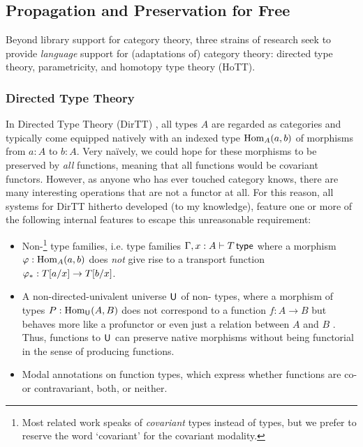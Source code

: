 \documentclass{lmcs} %
\theoremstyle{plain}\newtheorem{satz}[thm]{Satz} %
\theoremstyle{plain}
\theoremstyle{definition}
\begin{document}
\subsection{Propagation and Preservation for Free}
Beyond library support for category theory, three strains of research seek to provide \emph{language} support for (adaptations of) category theory:
directed type theory, parametricity, and homotopy type theory (HoTT).

\subsubsection{Directed Type Theory}
In Directed Type Theory (DirTT) \cite{2dtt,riehl-shulman-dtt,north-dirhott,weaver-licata-dua,dua-simplicial}, all types $A$ are regarded as categories and typically come equipped natively with an indexed type ${\mathrm{Hom}}_A(a, b)$ of morphisms from $a : A$ to $b : A$.
Very na\"ively, we could hope for these morphisms to be preserved by \emph{all} functions, meaning that all functions would be covariant functors.
However, as anyone who has ever touched category knows, there are many interesting operations that are not a functor at all.
For this reason, all systems for DirTT hitherto developed (to my knowledge), feature one or more of the following internal features to escape this unreasonable requirement:
\begin{itemize}
	\item Non-\covarfib{}\footnote{Most related work speaks of \emph{covariant} types instead of \covarfib{} types, but we prefer to reserve the word `covariant' for the covariant modality.} type families, i.e. type families $\Gamma, x : A \vdash T \,\mathsf{type}$ where a morphism $\varphi : {\mathrm{Hom}}_A(a, b)$ does \emph{not} give rise to a transport function $\varphi_* : T[a/x] \to T[b/x]$.
	\item A non-directed-univalent universe $\mathsf{U}_{}$ of non-\covarfib{} types, where a morphism of types $P : {\mathrm{Hom}}_{\mathsf{U}_{}}(A, B)$ does not correspond to a function $f : A \to B$ but behaves more like a profunctor or even just a relation between $A$ and $B$ \cite{riehl-shulman-dtt,weaver-licata-dua,dua-simplicial}.
	Thus, functions to $\mathsf{U}_{}$ can preserve native morphisms without being functorial in the sense of producing functions.
	\item Modal annotations on function types, which express whether functions are co- or contravariant, both, or neither. \cite{abel-polarized,2dtt,mathesis,north-dirhott,dua-simplicial}
\end{itemize}
\end{document}
